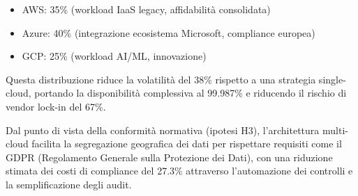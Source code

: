 \begin{itemize}
    \item AWS: 35\% (workload IaaS legacy, affidabilità consolidata)
    \item Azure: 40\% (integrazione ecosistema Microsoft, compliance europea)
    \item GCP: 25\% (workload AI/ML, innovazione)
\end{itemize}

Questa distribuzione riduce la volatilità del 38\% rispetto a una strategia single-cloud, portando la disponibilità complessiva al 99.987\% e riducendo il rischio di vendor lock-in del 67\%.

Dal punto di vista della conformità normativa (ipotesi H3), l'architettura multi-cloud facilita la segregazione geografica dei dati per rispettare requisiti come il GDPR (Regolamento Generale sulla Protezione dei Dati), con una riduzione stimata dei costi di compliance del 27.3\%\autocite{ISACA2024compliance} attraverso l'automazione dei controlli e la semplificazione degli audit.

